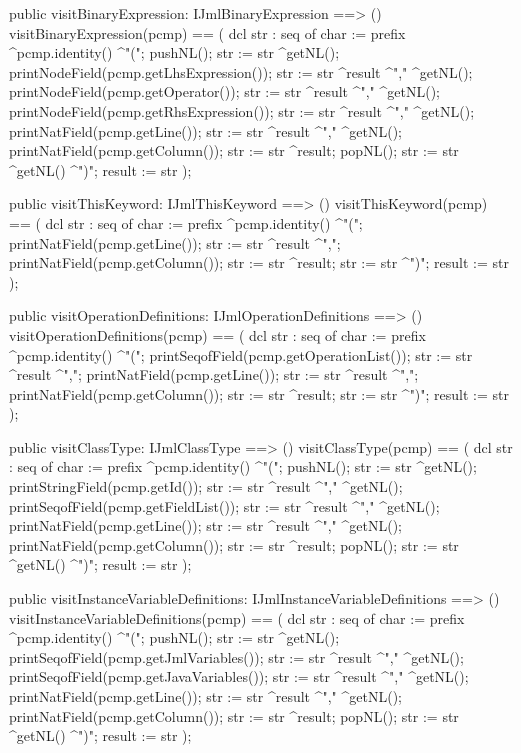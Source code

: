 \begin{vdm_al}
  public visitBinaryExpression: IJmlBinaryExpression ==> ()
  visitBinaryExpression(pcmp) ==
    ( dcl str : seq of char := prefix ^pcmp.identity() ^"(";
      pushNL();
      str := str ^getNL();
      printNodeField(pcmp.getLhsExpression());
      str := str ^result ^"," ^getNL();
      printNodeField(pcmp.getOperator());
      str := str ^result ^"," ^getNL();
      printNodeField(pcmp.getRhsExpression());
      str := str ^result ^"," ^getNL();
      printNatField(pcmp.getLine());
      str := str ^result ^"," ^getNL();
      printNatField(pcmp.getColumn());
      str := str ^result;
      popNL();
      str := str ^getNL() ^")";
      result := str );

  public visitThisKeyword: IJmlThisKeyword ==> ()
  visitThisKeyword(pcmp) ==
    ( dcl str : seq of char := prefix ^pcmp.identity() ^"(";
      printNatField(pcmp.getLine());
      str := str ^result ^",";
      printNatField(pcmp.getColumn());
      str := str ^result;
      str := str ^")";
      result := str );

  public visitOperationDefinitions: IJmlOperationDefinitions ==> ()
  visitOperationDefinitions(pcmp) ==
    ( dcl str : seq of char := prefix ^pcmp.identity() ^"(";
      printSeqofField(pcmp.getOperationList());
      str := str ^result ^",";
      printNatField(pcmp.getLine());
      str := str ^result ^",";
      printNatField(pcmp.getColumn());
      str := str ^result;
      str := str ^")";
      result := str );

  public visitClassType: IJmlClassType ==> ()
  visitClassType(pcmp) ==
    ( dcl str : seq of char := prefix ^pcmp.identity() ^"(";
      pushNL();
      str := str ^getNL();
      printStringField(pcmp.getId());
      str := str ^result ^"," ^getNL();
      printSeqofField(pcmp.getFieldList());
      str := str ^result ^"," ^getNL();
      printNatField(pcmp.getLine());
      str := str ^result ^"," ^getNL();
      printNatField(pcmp.getColumn());
      str := str ^result;
      popNL();
      str := str ^getNL() ^")";
      result := str );

  public visitInstanceVariableDefinitions: IJmlInstanceVariableDefinitions ==> ()
  visitInstanceVariableDefinitions(pcmp) ==
    ( dcl str : seq of char := prefix ^pcmp.identity() ^"(";
      pushNL();
      str := str ^getNL();
      printSeqofField(pcmp.getJmlVariables());
      str := str ^result ^"," ^getNL();
      printSeqofField(pcmp.getJavaVariables());
      str := str ^result ^"," ^getNL();
      printNatField(pcmp.getLine());
      str := str ^result ^"," ^getNL();
      printNatField(pcmp.getColumn());
      str := str ^result;
      popNL();
      str := str ^getNL() ^")";
      result := str );


\end{vdm_al}
